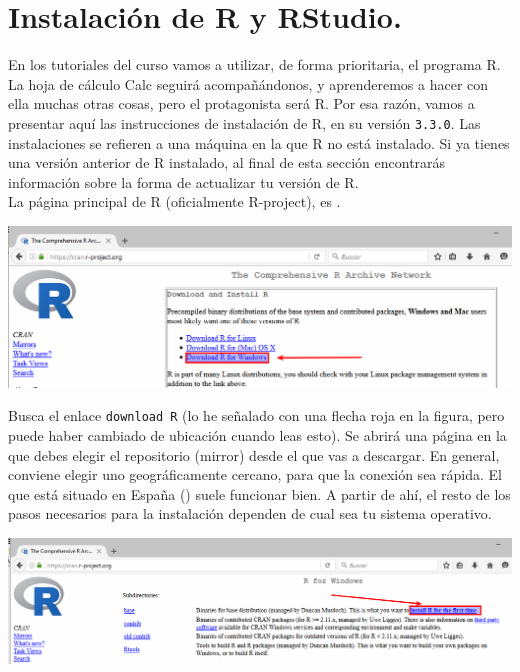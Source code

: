 \documentclass[10pt,a4paper]{article}
\newcounter {cont01}
\begin{document}
\section{Instalación de R y RStudio.}

En los tutoriales del curso vamos a utilizar, de forma prioritaria, el programa R. La hoja de
cálculo Calc seguirá acompañándonos, y aprenderemos a hacer con ella muchas otras cosas, pero el
protagonista será R. Por esa razón, vamos a presentar aquí las instrucciones de instalación de R,
en su versión {\tt 3.3.0}. Las instalaciones se refieren a una máquina en la que R {\sf no está
instalado}.
Si ya tienes una versión anterior de R instalado, al final de esta sección encontrarás información sobre la forma de actualizar tu versión de R. \quad\\
La página principal de R (oficialmente R-project), es
.
    \begin{center}
    \includegraphics[width=15cm]{../fig/Tut00-35.png}
    \end{center}
Busca el enlace {\tt download R} (lo he señalado con una flecha roja en la figura, pero puede haber
cambiado de ubicación cuando leas esto). Se abrirá una página en la que debes elegir el repositorio
(mirror) desde el que vas a descargar. En general, conviene elegir uno geográficamente cercano,
para que la conexión sea rápida. El que está situado en España
() suele funcionar bien. A partir de
ahí, el resto de los pasos necesarios para la instalación dependen de cual sea tu sistema
operativo.
    \begin{center}
    \includegraphics[width=15cm]{../fig/Tut00-36.png}
    \end{center}
\end{document}
